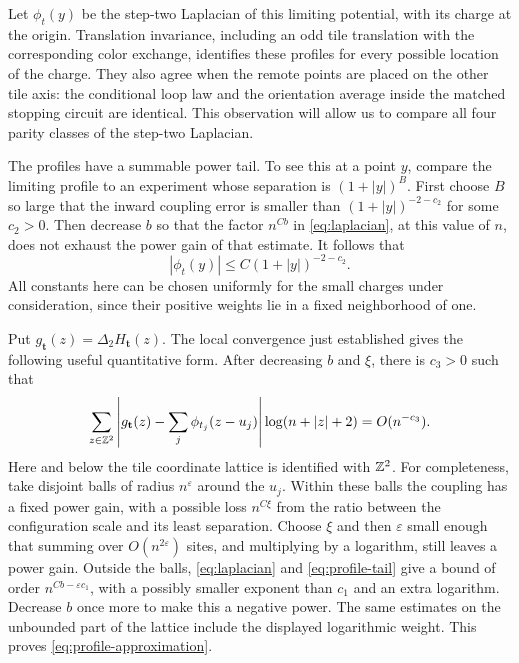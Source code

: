Let $\phi_t(y)$ be the step-two Laplacian of this limiting potential,
with its charge at the origin.  Translation invariance, including an
odd tile translation with the corresponding color exchange, identifies
these profiles for every possible location of the charge.  They also
agree when the remote points are placed on the other tile axis: the
conditional loop law and the orientation average inside the matched
stopping circuit are identical.  This observation will allow us to
compare all four parity classes of the step-two Laplacian.

The profiles have a summable power tail.  To see this at a point $y$,
compare the limiting profile to an experiment whose separation is
$(1+|y|)^B$.  First choose $B$ so large that the inward coupling error
is smaller than $(1+|y|)^{-2-c_2}$ for some $c_2>0$.
Then decrease $b$ so that the factor $n^{Cb}$ in
\eqref{eq:laplacian}, at this value of $n$, does not exhaust the
power gain of that estimate.  It follows that
\begin{equation}\label{eq:profile-tail}
 |\phi_t(y)|\le C(1+|y|)^{-2-c_2}.
\end{equation}
All constants here can be chosen uniformly for the small charges under
consideration, since their positive weights lie in a fixed neighborhood
of one.

Put $g_{\mathbf t}(z)=\Delta_2H_{\mathbf t}(z)$.
The local convergence just established gives the following useful
quantitative form.  After decreasing $b$ and $\xi$, there is $c_3>0$
such that
\begin{equation}\label{eq:profile-approximation}
 \sum_{z\in\mathbb Z^2}
 \left|g_{\mathbf t}(z)-
              \sum_j\phi_{t_j}(z-u_j)\right|
 \log(n+|z|+2)=O(n^{-c_3}).
\end{equation}
Here and below the tile coordinate lattice is identified with $\mathbb Z^2$.
For completeness, take disjoint balls of radius $n^\varepsilon$ around
the $u_j$.  Within these balls the coupling has a fixed power gain,
with a possible loss $n^{C\xi}$ from the ratio between the configuration
scale and its least separation.  Choose $\xi$ and then $\varepsilon$
small enough that summing over $O(n^{2\varepsilon})$ sites, and
multiplying by a logarithm, still leaves a power gain.  Outside the
balls, \eqref{eq:laplacian} and \eqref{eq:profile-tail} give a bound
of order $n^{Cb-\varepsilon c_1}$, with a possibly smaller exponent
than $c_1$ and an extra logarithm.  Decrease $b$ once more to make this
a negative power.  The same estimates on the unbounded part of the
lattice include the displayed logarithmic weight.  This proves
\eqref{eq:profile-approximation}.

